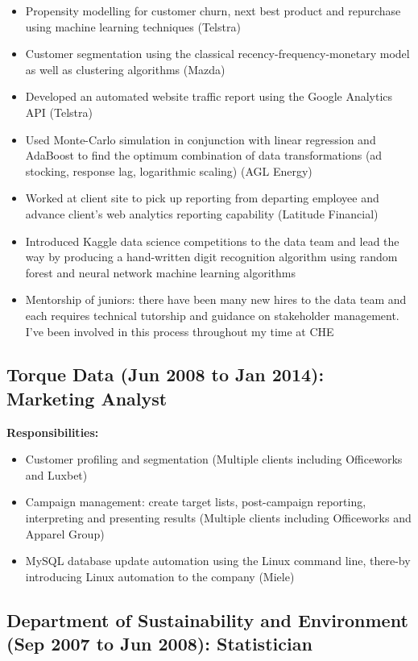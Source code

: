 \documentclass{article}
\begin{document}
\begin{itemize}
    \item Propensity modelling for customer churn, next best product and repurchase using machine learning techniques (Telstra)
    \item Customer segmentation using the classical recency-frequency-monetary model as well as clustering algorithms (Mazda)
    \item Developed an automated website traffic report using the Google Analytics API (Telstra)
    \item Used Monte-Carlo simulation in conjunction with linear regression and AdaBoost to find the optimum combination of data transformations (ad stocking, response lag, logarithmic scaling) (AGL Energy)
    \item Worked at client site to pick up reporting from departing employee and advance client's web analytics reporting capability (Latitude Financial)
    \item Introduced Kaggle data science competitions to the data team and lead the way by producing a hand-written digit recognition algorithm using random forest and neural network machine learning algorithms
    \item Mentorship of juniors: there have been many new hires to the data team and each requires technical tutorship and guidance on stakeholder management. I've been involved in this process throughout my time at CHE
\end{itemize}

\subsection{Torque Data (Jun 2008 to Jan 2014): Marketing Analyst}

\textbf{Responsibilities:}
\begin{itemize}
    \item Customer profiling and segmentation (Multiple clients including Officeworks and Luxbet) 
    \item Campaign management: create target lists, post-campaign reporting, interpreting and presenting results (Multiple clients including Officeworks and Apparel Group)
    \item MySQL database update automation using the Linux command line, there\hyp{}by introducing Linux automation to the company (Miele)
\end{itemize}

\subsection{Department of Sustainability and Environment (Sep 2007 to Jun 2008): Statistician}
\end{document}
